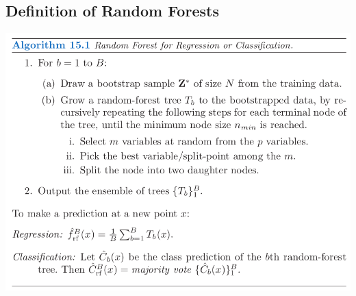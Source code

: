 \documentclass[11pt]{article}
\begin{document}
\subsection{Definition of Random Forests}
\label{sec:org290417b}
\begin{center}
\includegraphics[width=.9\linewidth]{Random forests/screenshot_2018-10-08_20-10-57.png}
\end{center}
\end{document}
